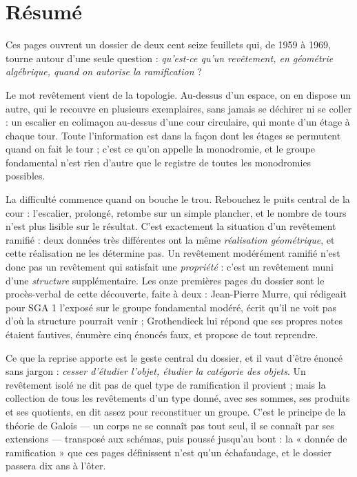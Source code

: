 \documentclass[11pt,a4paper]{article}
\begin{document}
\section*{Résumé}

\begin{resume}
Ces pages ouvrent un dossier de deux cent seize feuillets qui, de 1959 à 1969,
tourne autour d'une seule question : \emph{qu'est-ce qu'un revêtement, en
géométrie algébrique, quand on autorise la ramification} ?

Le mot revêtement vient de la topologie. Au-dessus d'un espace, on en dispose
un autre, qui le recouvre en plusieurs exemplaires, sans jamais se déchirer ni
se coller : un escalier en colimaçon au-dessus d'une cour circulaire, qui monte
d'un étage à chaque tour. Toute l'information est dans la façon dont les
étages se permutent quand on fait le tour ; c'est ce qu'on appelle la
monodromie, et le groupe fondamental n'est rien d'autre que le registre de
toutes les monodromies possibles.

La difficulté commence quand on bouche le trou. Rebouchez le puits central de
la cour : l'escalier, prolongé, retombe sur un simple plancher, et le nombre
de tours n'est plus lisible sur le résultat. C'est exactement la situation d'un
revêtement ramifié : deux données très différentes ont la même
\emph{réalisation géométrique}, et cette réalisation ne les détermine pas. Un
revêtement modérément ramifié n'est donc pas un revêtement qui satisfait une
\emph{propriété} : c'est un revêtement muni d'une \emph{structure}
supplémentaire. Les onze premières pages du dossier sont le procès-verbal de
cette découverte, faite à deux : Jean-Pierre Murre, qui rédigeait pour SGA 1
l'exposé sur le groupe fondamental modéré, écrit qu'il ne voit pas d'où la
structure pourrait venir ; Grothendieck lui répond que ses propres notes
étaient fautives, énumère cinq énoncés faux, et propose de tout reprendre.

Ce que la reprise apporte est le geste central du dossier, et il vaut d'être
énoncé sans jargon : \emph{cesser d'étudier l'objet, étudier la catégorie des
objets}. Un revêtement isolé ne dit pas de quel type de ramification il
provient ; mais la collection de tous les revêtements d'un type donné, avec ses
sommes, ses produits et ses quotients, en dit assez pour reconstituer un
groupe. C'est le principe de la théorie de Galois — un corps ne se connaît pas
tout seul, il se connaît par ses extensions — transposé aux schémas, puis
poussé jusqu'au bout : la « donnée de ramification » que ces pages définissent
n'est qu'un échafaudage, et le dossier passera dix ans à l'ôter.


\end{resume}
\end{document}

